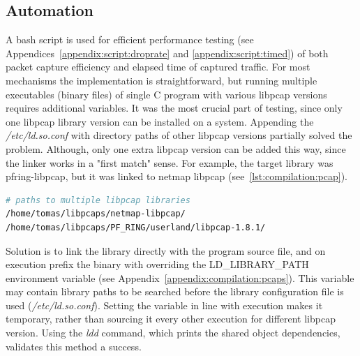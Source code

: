 \documentclass[12pt,a4paper,twoside]{report}
\begin{document}
		\subsection{Automation} \label{analysis:testing:auto}
			A bash script is used for efficient performance testing (see Appendices~\ref{appendix:script:droprate} and \ref{appendix:script:timed}) of both packet capture efficiency and elapsed time of captured traffic. For most mechanisms the implementation is straightforward, but running multiple executables (binary files) of single C program with various libpcap versions requires additional variables. It was the most crucial part of testing, since only one libpcap library version can be installed on a system. Appending the \emph{/etc/ld.so.conf} with directory paths of other libpcap versions partially solved the problem. Although, only one extra libpcap version can be added this way, since the linker works in a "first match" sense. For example, the target library was pfring-libpcap, but it was linked to netmap libpcap (see~\autoref{lst:compilation:pcap}).
			\begin{lstlisting}[language=bash, caption=Contents of /etc/ld.so.conf.d/libpcaps.conf, label=lst:compilation:pcap]
# paths to multiple libpcap libraries
/home/tomas/libpcaps/netmap-libpcap/
/home/tomas/libpcaps/PF_RING/userland/libpcap-1.8.1/
			\end{lstlisting}
			\par
			Solution is to link the library directly with the program source file, and on execution prefix the binary with overriding the LD\_LIBRARY\_PATH \cite{web:libraries:ldpath} environment variable (see Appendix~\ref{appendix:compilation:pcaps}). This variable may contain library paths to be searched before the library configuration file is used (\emph{/etc/ld.so.conf}). Setting the variable in line with execution makes it temporary, rather than sourcing it every other execution for different libpcap version. Using the \emph{ldd} command, which prints the shared object dependencies, validates this method a success.
\end{document}

